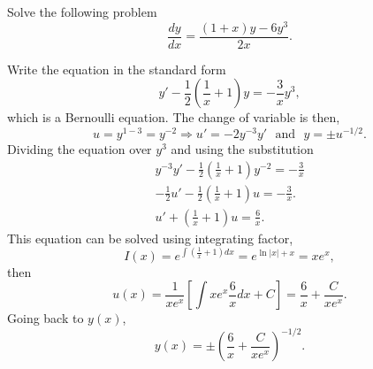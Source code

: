 \documentclass[11pt]{article}
\begin{document}
\begin{problem}
Solve the following problem
\begin{equation*}
     \frac{dy}{dx}=\frac{(1+x)y-6y^{3}}{2x}.
\end{equation*}
\end{problem}
\begin{solution}
Write the equation in the standard form
\[y'-\frac{1}{2}\left(\frac{1}{x}+1\right)y=-\frac{3}{x}y^{3},\]
which is a Bernoulli equation. The change of variable is then,
\[u = y^{1-3}=y^{-2}\Rightarrow u'=-2 y^{-3}y' \,\,\text{ and }\,\, y = \pm u^{-1/2}.\]
Dividing the equation over $y^{3}$ and using the substitution
\begin{gather*}
y^{-3}y'-\frac{1}{2}\left(\frac{1}{x}+1\right)y^{-2}=-\frac{3}{x} \\
-\frac{1}{2}u' - \frac{1}{2} \left(\frac{1}{x}+1\right)u=-\frac{3}{x}. \\
u' + \left(\frac{1}{x}+1\right)u=\frac{6}{x}.
\end{gather*}
This equation can be solved using integrating factor,
\[I(x)=e^{\int\left(\frac{1}{x}+1\right)dx}=e^{\ln|x|+x}=xe^{x},\]
then
\[u(x)= \frac{1}{x e^{x}}\left[\int xe^{x}\frac{6}{x}dx + C\right]= \frac{6}{x}+\frac{C}{xe^{x}}.\]
Going back to $y(x)$,
\[\boxed{y(x)= \pm\left(\frac{6}{x}+\frac{C}{xe^{x}}\right)^{-1/2}}.\]
\end{solution}
\end{document}
